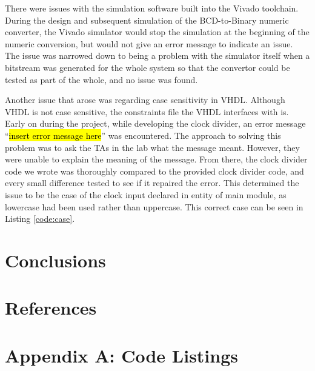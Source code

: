 \documentclass[11pt]{article}
\begin{document}
There were issues with the simulation software built into the Vivado toolchain. During the design and subsequent simulation of the BCD-to-Binary numeric converter, the Vivado simulator would stop the simulation at the beginning of the numeric conversion, but would not give an error message to indicate an issue. The issue was narrowed down to being a problem with the simulator itself when a bitstream was generated for the whole system so that the convertor could be tested as part of the whole, and no issue was found.

Another issue that arose was regarding case sensitivity in VHDL. Although VHDL is not case sensitive, the constraints file the VHDL interfaces with is. Early on during the project, while developing the clock divider, an error message ``\hl{insert error message here}'' was encountered. The approach to solving this problem was to ask the TAs in the lab what the message meant. However, they were unable to explain the meaning of the message. From there, the clock divider code we wrote was thoroughly compared to the provided clock divider code, and every small difference tested to see if it repaired the error. This determined the issue to be the case of the clock input declared in entity of main module, as lowercase had been used rather than uppercase. This correct case can be seen in Listing \ref{code:case}.

\section{Conclusions}


\newpage

\section{References}
\printbibliography

\newpage

\section{Appendix A: Code Listings}
\end{document}
